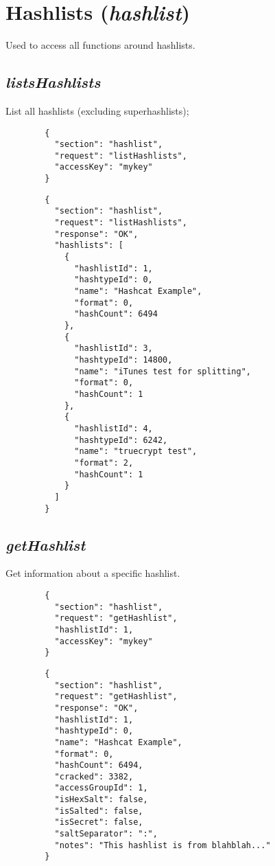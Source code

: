 \section*{Hashlists (\textit{hashlist})}
	Used to access all functions around hashlists.

\subsection*{\textit{listsHashlists}}
	List all hashlists (excluding superhashlists);
	{
		\color{blue}
		\begin{verbatim}
		{
		  "section": "hashlist",
		  "request": "listHashlists",
		  "accessKey": "mykey"
		}
		\end{verbatim}
	}
	{
		\color{OliveGreen}
		\begin{verbatim}
		{
		  "section": "hashlist",
		  "request": "listHashlists",
		  "response": "OK",
		  "hashlists": [
		    {
		      "hashlistId": 1,
		      "hashtypeId": 0,
		      "name": "Hashcat Example",
		      "format": 0,
		      "hashCount": 6494
		    },
		    {
		      "hashlistId": 3,
		      "hashtypeId": 14800,
		      "name": "iTunes test for splitting",
		      "format": 0,
		      "hashCount": 1
		    },
		    {
		      "hashlistId": 4,
		      "hashtypeId": 6242,
		      "name": "truecrypt test",
		      "format": 2,
		      "hashCount": 1
		    }
		  ]
		}
		\end{verbatim}
	}
\subsection*{\textit{getHashlist}}
	Get information about a specific hashlist.
	{
		\color{blue}
		\begin{verbatim}
		{
		  "section": "hashlist",
		  "request": "getHashlist",
		  "hashlistId": 1,
		  "accessKey": "mykey"
		}
		\end{verbatim}
	}
	{
		\color{OliveGreen}
		\begin{verbatim}
		{
		  "section": "hashlist",
		  "request": "getHashlist",
		  "response": "OK",
		  "hashlistId": 1,
		  "hashtypeId": 0,
		  "name": "Hashcat Example",
		  "format": 0,
		  "hashCount": 6494,
		  "cracked": 3382,
		  "accessGroupId": 1,
		  "isHexSalt": false,
		  "isSalted": false,
		  "isSecret": false,
		  "saltSeparator": ":",
		  "notes": "This hashlist is from blahblah..."
		}
		\end{verbatim}
	}
